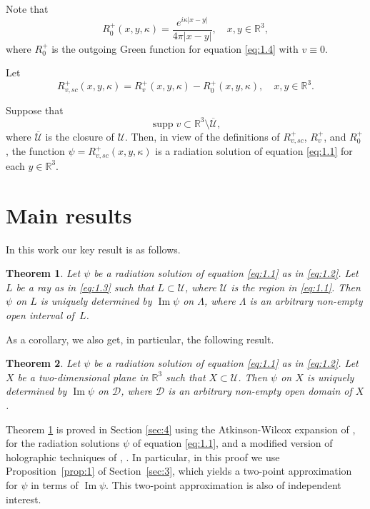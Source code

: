 \documentclass[10pt,a4paper]{amsart}
\DeclareMathOperator{\supp}{supp}
\newcommand{\RR}{\mathbb R}
\renewcommand{\Im}{\mathop{\mathrm{Im}}}
\newtheorem{theorem}{Theorem}
\theoremstyle{definition}
\begin{document}
\setcounter{equation}{5}
Note that
\begin{equation}\label{eq:1.7}
R_0^+(x, y, \kappa)=\frac{e^{i\kappa|x-y|}}{4\pi|x-y|},\quad x,y\in \RR^3,
\end{equation}
where $R_0^+$ is the outgoing Green function for equation \eqref{eq:1.4} with $v \equiv 0$.

Let
\begin{equation}\label{eq:1.8}
R_{v,sc}^+(x, y, \kappa)=R_v^+(x, y, \kappa)-R_0^+(x, y, \kappa),\quad x,y\in \RR^3.
\end{equation}

Suppose that
\begin{equation}
\label{eq:1.5}
\supp v \subset \RR^3\setminus \overline {\mathcal{U}},
\end{equation}
where $\overline {\mathcal{U}}$ is the closure of $\mathcal{U}$.
Then, in view of the definitions of $R_{v,sc}^+$, $R_v^+$, and $R_0^+$, the function $\psi=R_{v,sc}^+(x, y, \kappa)$ is a radiation solution of equation \eqref{eq:1.1}
for each $y\in \RR^3$.

\section{Main results}\label{sec:2}

In this work our key result is as follows.

\begin{theorem}\label{th:1}
Let $\psi$ be a radiation solution of equation \eqref{eq:1.1} as in \eqref{eq:1.2}.
Let $L$ be a ray as in \eqref{eq:1.3} such that $L \subset \mathcal{U}$, where $\mathcal{U}$ is the region in \eqref{eq:1.1}. Then $\psi$ on $L$ is uniquely determined by $\Im \psi$ on $\Lambda$,
where $\Lambda$ is an arbitrary non-empty open interval of~$L$.
\end{theorem}

As a corollary, we also get, in particular, the following result.

\begin{theorem}\label{th:2}
Let $\psi$ be a radiation solution of equation \eqref{eq:1.1} as in \eqref{eq:1.2}.
Let $X$ be a two-dimensional plane in $\RR^3$ such that $X\subset \mathcal{U}$.
Then $\psi$ on $X$ is uniquely determined by $\Im \psi$ on $\mathcal{D}$,
where $\mathcal{D}$ is an arbitrary non-empty open domain of $X$.
\end{theorem}

Theorem \ref{th:1} is proved in Section \ref{sec:4} using the Atkinson-Wilcox expansion of \cite{A}, \cite{W} for the radiation solutions $\psi$ of equation \eqref{eq:1.1}, and a modified version of holographic techniques of \cite{N1}, \cite{N5}.
In particular, in this proof we use Proposition~\ref{prop:1} of Section~\ref{sec:3}, which yields a two-point approximation for $\psi$
in terms of $\Im \psi$. This two-point approximation is also of independent interest.
\end{document}
